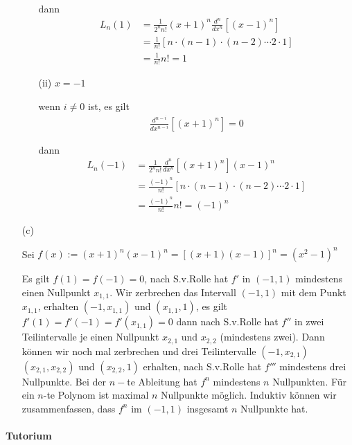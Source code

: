 \begin{enumerate}
\begin{enumerate}
dann
\begin{align*}
L_n(1)
&=\frac{1}{2^n n!}(x+1)^n\frac{d^n}{dx^n}[(x-1)^n] \\
&=\frac{1}{n!}[n\cdot (n-1)\cdot (n-2)\cdots 2\cdot 1] \\
&=\frac{1}{n!}n!=1
\end{align*}

\item[(ii)]$x=-1$

wenn $i\neq 0$ ist, es gilt
\begin{align*}
\frac{d^{n-i}}{dx^{n-i}}[(x+1)^n]=0
\end{align*}

dann
\begin{align*}
L_n(-1)
&=\frac{1}{2^n n!}\frac{d^n}{dx^n}[(x+1)^n](x-1)^n \\
&=\frac{(-1)^n}{n!}[n\cdot (n-1)\cdot (n-2)\cdots 2\cdot 1] \\
&=\frac{(-1)^n}{n!}n!=(-1)^n
\end{align*}

\end{enumerate}

\item[(c)]

Sei $f(x):=(x+1)^n(x-1)^n=[(x+1)(x-1)]^n=(x^2-1)^n$

Es gilt $f(1)=f(-1)=0$, nach S.v.Rolle hat $f'$ in $(-1,1)$ mindestens einen Nullpunkt $x_{1,1}$. Wir zerbrechen das Intervall $(-1,1)$ mit dem Punkt $x_{1,1}$, erhalten $(-1,x_{1,1})$ und $(x_{1,1},1)$, es gilt $f'(1)=f'(-1)=f'(x_{1,1})=0$ dann nach S.v.Rolle hat $f''$ in zwei Teilintervalle je einen Nullpunkt $x_{2,1}$ und $x_{2,2}$ (mindestens zwei). Dann können wir noch mal zerbrechen und drei Teilintervalle $(-1,x_{2,1})$ $(x_{2,1},x_{2,2})$ und $(x_{2,2},1)$ erhalten, nach S.v.Rolle hat $f'''$ mindestens drei Nullpunkte. Bei der $n-$te Ableitung hat $f^n$ mindestens $n$ Nullpunkten. Für ein $n$-te Polynom ist maximal $n$ Nullpunkte möglich. Induktiv können wir zusammenfassen, dass $f^n$ im $(-1,1)$ insgesamt $n$ Nullpunkte hat.

\end{enumerate}

\newpage

\paragraph{Tutorium}

